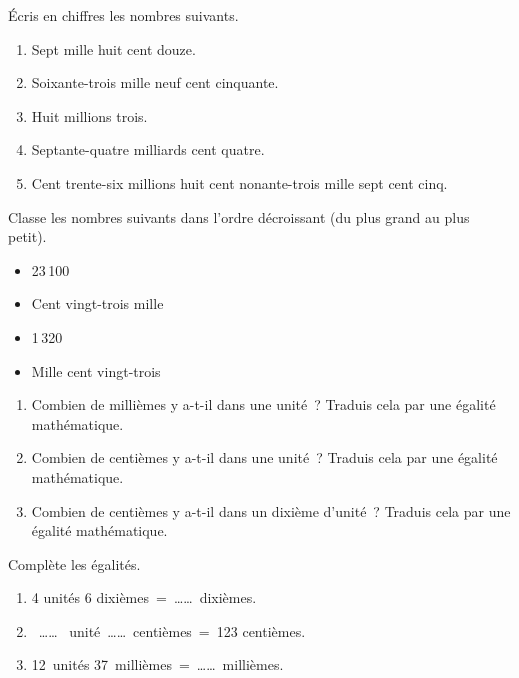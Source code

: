 \begin{exercice}
Écris en chiffres les nombres suivants.
\begin{enumerate}
 \item Sept mille huit cent douze.
 \item Soixante-trois mille neuf cent cinquante.
 \item Huit millions trois.
 \item Septante-quatre milliards cent quatre.
 \item Cent trente-six millions huit cent nonante-trois mille sept cent cinq.
 \end{enumerate}
\end{exercice}

\begin{exercice}
Classe les nombres suivants dans l'ordre décroissant (du plus grand au plus petit).
\begin{itemize}
 \item 23\,100
 \item Cent vingt-trois mille
 \item 1\,320
 \item Mille cent vingt-trois %
 \end{itemize}
\end{exercice}



\begin{exercice}
\begin{enumerate}
 \item Combien de millièmes y a-t-il dans une unité ?
Traduis cela par une égalité mathématique.
 \item Combien de centièmes y a-t-il dans une unité ? Traduis cela par une égalité mathématique.
 \item Combien de centièmes y a-t-il dans un dixième d'unité ? Traduis cela par une égalité mathématique.
 \end{enumerate}
\end{exercice}


\begin{exercice}
Complète les égalités.
\begin{enumerate}
 \item 4 unités 6 dixièmes = …… dixièmes.
 \item  ……  unité …… centièmes = 123 centièmes.
 \item 12 unités 37 millièmes = …… millièmes.
 \end{enumerate}
\end{exercice}


